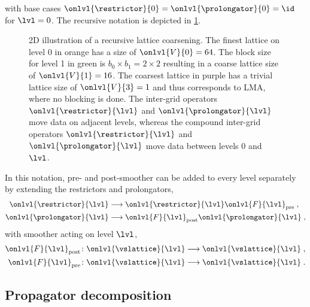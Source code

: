 with base cases $\onlvl{\mathcal{\restrictor}}{0} = \onlvl{\mathcal{\prolongator}}{0} = \id$ for $\lvl=0$.
The recursive notation is depicted in \cref{fig:recursive:nesting}.
\begin{figure}
\centering
%

\caption{2D illustration of a recursive lattice coarsening. The finest lattice on level \num{0} in orange has a size of $\onlvl{V}{0}=64$. The block size for level \num{1} in green is $b_0\times b_1=2\times2$ resulting in a coarse lattice size of $\onlvl{V}{1}=16$. The coarsest lattice in purple has a trivial lattice size of $\onlvl{V}{3}=1$ and thus corresponds to LMA, where no blocking is done. The inter-grid operators $\onlvl{\restrictor}{\lvl}$ and $\onlvl{\prolongator}{\lvl}$ move data on adjacent levels, whereas the compound inter-grid operators $\onlvl{\mathcal{\restrictor}}{\lvl}$ and $\onlvl{\mathcal{\prolongator}}{\lvl}$ move data between levels \num{0} and $\lvl$. \takenfull }
\label{fig:recursive:nesting}
\end{figure}

In this notation, pre- and post-smoother can be added to every level separately by extending the restrictors and prolongators,
\begin{align}
\onlvl{\restrictor}{\lvl} &\longrightarrow \onlvl{\restrictor}{\lvl} \onlvl{F}{\lvl}_{\text{pre}} \;, \\
\onlvl{\prolongator}{\lvl} &\longrightarrow \onlvl{F}{\lvl}_{\text{post}} \onlvl{\prolongator}{\lvl} \;,
\end{align}
with smoother acting on level $\lvl$,
\begin{align}
\onlvl{F}{\lvl}_{\text{post}} &\colon \onlvl{\vslattice}{\lvl} \longrightarrow \onlvl{\vslattice}{\lvl} \;, \\
\onlvl{F}{\lvl}_{\text{pre}} &\colon \onlvl{\vslattice}{\lvl} \longrightarrow \onlvl{\vslattice}{\lvl} \;.
\end{align}

\subsection{Propagator decomposition}

